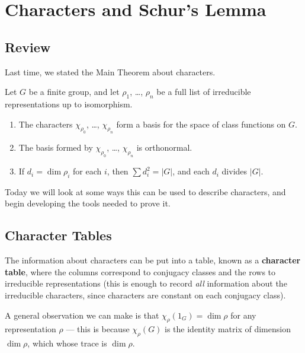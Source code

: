 


\section{Characters and Schur's Lemma}

\subsection{Review}
Last time, we stated the Main Theorem about characters. 
\begin{theorem}
Let $G$ be a finite group, and let $\rho_1$, \ldots, $\rho_n$ be a full list of irreducible representations up to isomorphism. 
\begin{enumerate}[label = (\alph*)]
    \item The characters $\chi_{\rho_0}$, \ldots, $\chi_{\rho_n}$ form a basis for the space of class functions on $G$.

    \item The basis formed by $\chi_{\rho_0}$, \ldots, $\chi_{\rho_n}$ is orthonormal.
    
    \item If $d_i = \dim \rho_i$ for each $i$, then $\sum d_i^2 = |G|$, and each $d_i$ divides $|G|$.
\end{enumerate}
\end{theorem}

Today we will look at some ways this can be used to describe characters, and begin developing the tools needed to prove it. 

\subsection{Character Tables}

The information about characters can be put into a table, known as a \textbf{character table}, where the columns correspond to conjugacy classes and the rows to irreducible representations (this is enough to record \emph{all} information about the irreducible characters, since characters are constant on each conjugacy class). 

A general observation we can make is that $\chi_\rho(1_G) = \dim \rho$ for any representation $\rho$ --- this is because $\chi_\rho(G)$ is the identity matrix of dimension $\dim \rho$, which whose trace is $\dim \rho$. 

